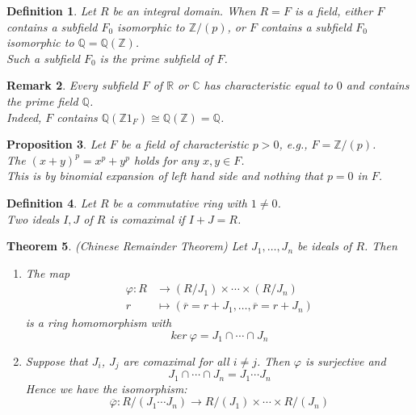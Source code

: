 \documentclass[a4paper,8pt]{article}
\newcommand{\R}{\mathbb{R}}
\newcommand{\Q}{\mathbb{Q}}
\newcommand{\C}{\mathbb{C}}
\newcommand{\Z}{\mathbb{Z}}
\newcommand{\hlt}[1]{\textit{{\color{blue}#1}}}
\theoremstyle{theorem}
\newtheorem{theorem}{Theorem}[subsection]
\newtheorem{proposition}[theorem]{Proposition}
\newtheorem{definition}[theorem]{Definition}
\newtheorem{remark}[theorem]{Remark}
\begin{document}
\begin{definition}
Let $R$ be an integral domain. When $R=F$ is a field, either $F$ contains a subfield $F_0$ isomorphic to $\Z /(p)$, or $F$ contains a subfield $F_0$ isomorphic to $\Q = \Q (\Z)$.\\
Such a subfield $F_0$ is the \hlt{prime subfield} of $F$.
\end{definition}

\begin{remark}
Every subfield $F$ of $\R$ or $\C$ has characteristic equal to $0$ and contains the prime field $\Q$.\\
Indeed, $F$ contains $\Q (\Z 1_F) \cong \Q (\Z) = \Q$.
\end{remark}

\begin{proposition}
Let $F$ be a field of characteristic $p>0$, e.g., $F = \Z / (p)$.\\
The $(x+y)^p = x^p + y^p$ holds for any $x, y \in F$.\\
This is by binomial expansion of left hand side and nothing that $p=0$ in $F$.
\end{proposition}

\begin{definition}
Let $R$ be a commutative ring with $1 \neq 0$.\\
Two ideals $I, J$ of $R$ is \hlt{comaximal} if $I+J = R$.	
\end{definition}

\begin{theorem}
\hlt{(Chinese Remainder Theorem)} Let $J_1, \ldots, J_n$ be ideals of $R$. Then
\begin{enumerate}[label=(\roman*)]
\item The map
\begin{align}
	\varphi : R &\rightarrow (R/J_1) \times \cdots \times (R/J_n) \nonumber\\
	r &\mapsto (\overline{r} = r+J_1, \ldots, \overline{r}=r+J_n) \nonumber
\end{align}
is a ring homomorphism with
\begin{equation}
	ker \ \varphi = J_1 \cap \cdots \cap J_n \nonumber
\end{equation}
\item Suppose that $J_i$, $J_j$ are comaximal for all $i \neq j$. Then $\varphi$ is surjective and
\begin{equation}
	J_1 \cap \cdots \cap J_n = J_1 \cdots J_n \nonumber
\end{equation}
Hence we have the isomorphism:
\begin{equation}
	\overline{\varphi}: R/(J_1 \cdots J_n) \rightarrow R/(J_1) \times \cdots \times R/(J_n) \nonumber
\end{equation}
\end{enumerate}
\end{theorem}
\end{document}
